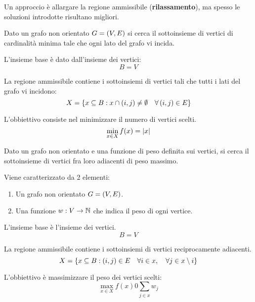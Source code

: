 \documentclass[\main/main.tex]{subfiles}
\begin{document}
\begin{multicols}{2}
\begin{observation}
        Un approccio è allargare la regione ammissibile (\textbf{rilassamento}), ma spesso le soluzioni introdotte risultano migliori.
    \end{observation}
    \begin{problem}
        Dato un grafo non orientato \(G = \left(V, E\right)\) si cerca il sottoinsieme di vertici di cardinalità minima tale che ogni lato del grafo vi incida.
    \end{problem}
    \begin{definition}
        L'insieme base è dato dall'insieme dei vertici:
        \[
            B = V
        \]
    \end{definition}
    \begin{definition}
        La regione ammissibile contiene i sottoinsiemi di vertici tali che tutti i lati del grafo vi incidono:
        \[
            X = \left\{x \subseteq B: x \cap \left(i,j\right) \neq \emptyset \quad \forall \left(i,j\right) \in E\right\}
        \]
    \end{definition}
    \begin{definition}
        L'obbiettivo consiste nel minimizzare il numero di vertici scelti.
        \[
            \min_{x \in X} f(x) = \left\lvert x\right\rvert
        \]
    \end{definition}
    \begin{problem}
        Dato un grafo non orientato e una funzione di peso definita sui vertici, si cerca il sottoinsieme di vertici fra loro adiacenti di peso massimo.
        
        Viene caratterizzato da 2 elementi:
        \begin{enumerate}
            \item Un grafo non orientato \(G = \left(V, E\right)\).
            \item Una funzione \(w: V \rightarrow \mathbb{N}\) che indica il peso di ogni vertice.
        \end{enumerate}
    \end{problem}
    \begin{definition}
        L'insieme base è l'insieme dei vertici.
        \[
            B = V
        \]
    \end{definition}
    \begin{definition}
        La regione ammissibile contiene i sottoinsiemi di vertici reciprocamente adiacenti.
        \[
            X = \left\{x \subseteq B: \left(i,j\right) \in E \quad \forall i \in x, \quad \forall j \in x \setminus {i}\right\}
        \]
    \end{definition}
    \begin{definition}
        L'obbiettivo è massimizzare il peso dei vertici scelti:
        \[
            \max_{x \in X} f(x) 0 \sum_{j \in x} w_j
        \]
    \end{definition}
\end{multicols}
\end{document}
